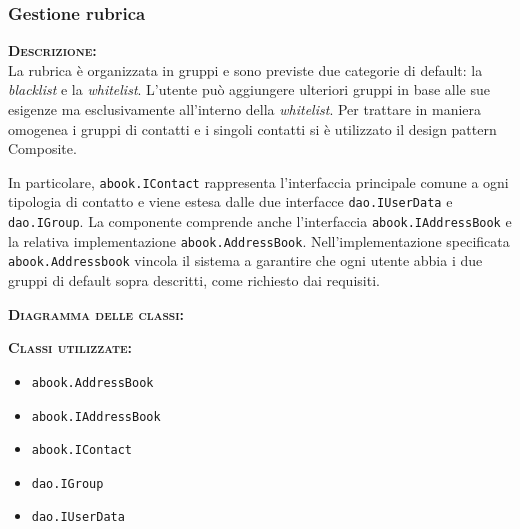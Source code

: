 \subsubsection{Gestione rubrica}
\begin{description}
	\item{\scshape\bfseries Descrizione:}\\
La rubrica è organizzata in gruppi e sono previste due categorie di default: la \textit{blacklist} e la \textit{whitelist}. L'utente può aggiungere ulteriori gruppi in base alle sue esigenze ma esclusivamente all'interno della \textit{whitelist}. Per trattare in maniera omogenea i gruppi di contatti e i singoli contatti si è utilizzato il design pattern Composite.

In particolare, \texttt{abook.IContact} rappresenta l'interfaccia principale comune a ogni tipologia di contatto e viene estesa dalle due interfacce \texttt{dao.IUserData} e \texttt{dao.IGroup}. La componente comprende anche l'interfaccia \texttt{abook.IAddressBook} e la relativa implementazione \texttt{abook.AddressBook}. Nell'implementazione specificata \texttt{abook.Addressbook} vincola il sistema a garantire che ogni utente abbia i due gruppi di default sopra descritti, come richiesto dai requisiti.

	\item{\scshape\bfseries Diagramma delle classi:}
	\item{\scshape\bfseries Classi utilizzate:}\\
\begin{itemize}
  \item \texttt{abook.AddressBook}
  \item \texttt{abook.IAddressBook}
  \item \texttt{abook.IContact}
  \item \texttt{dao.IGroup}
  \item \texttt{dao.IUserData}
\end{itemize}

\end{description}

